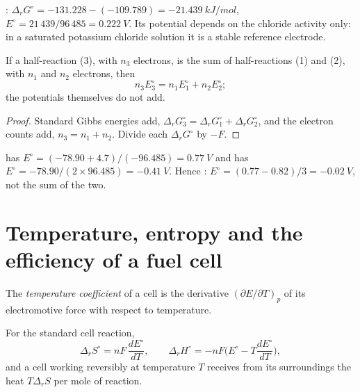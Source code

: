\begin{example}\label{ex:b2:cell-thermodynamics:agcl}
: $\Delta_r G^\circ = -131.228 - (-109.789) =
\qty{-21.439}{kJ/mol}$, $E^\circ = 21\,439/96\,485 = \qty{0.222}{V}$. Its potential
depends on the chloride activity only: in a saturated potassium chloride
solution it is a stable reference electrode.
\end{example}

\begin{proposition}\label{prop:b2:cell-thermodynamics:combining}
If a half-reaction (3), with $n_3$ electrons, is the sum of half-reactions (1)
and (2), with $n_1$ and $n_2$ electrons, then
\[
  n_3E_3^\circ = n_1E_1^\circ + n_2E_2^\circ ;
\]
the potentials themselves do not add.
\end{proposition}

\begin{proof}
Standard Gibbs energies add, $\Delta_r G_3^\circ = \Delta_r G_1^\circ + \Delta_r
G_2^\circ$, and the electron counts add, $n_3 = n_1 + n_2$. Divide each $\Delta_r
G^\circ$ by $-F$.
\end{proof}

\begin{example}\label{ex:b2:cell-thermodynamics:iron}
 has $E^\circ = (-78.90 + 4.7)/(-96.485) = \qty{0.77}{V}$
and  has $E^\circ = -78.90/(2 \times 96.485) =
\qty{-0.41}{V}$. Hence : $E^\circ = (0.77 - 0.82)/3 =
\qty{-0.02}{V}$, not the sum of the two.
\end{example}

\section{Temperature, entropy and the efficiency of a fuel cell}

\begin{definition}\label{def:b2:cell-thermodynamics:temperature-coefficient}
The \emph{temperature coefficient} of a cell is
the derivative $(\partial E/\partial T)_p$ of its electromotive force with
respect to temperature.
\end{definition}

\begin{proposition}\label{prop:b2:cell-thermodynamics:entropy}
For the standard cell reaction,
\[
  \Delta_r S^\circ = nF\,\frac{dE^\circ}{dT}, \qquad
  \Delta_r H^\circ = -nF\Big(E^\circ - T\frac{dE^\circ}{dT}\Big),
\]
and a cell working reversibly at temperature $T$ receives from its
surroundings the heat $T\Delta_r S$ per mole of reaction.
\end{proposition}

